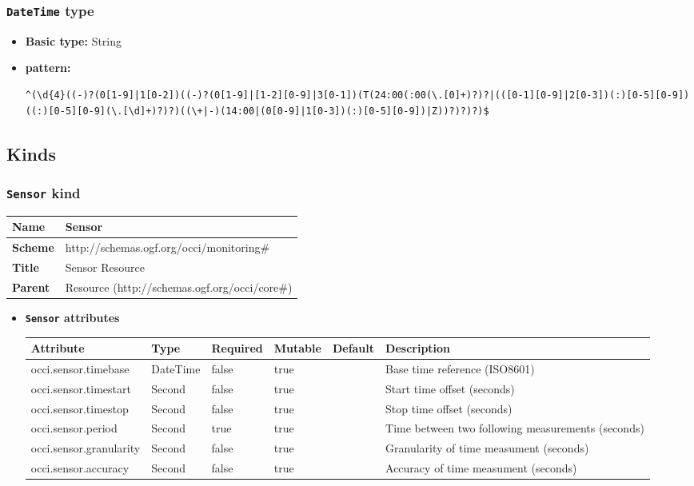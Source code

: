 \subsubsection{\texttt{DateTime} type}

\begin{itemize}
\item \textbf{Basic type:} String
	\item \textbf{pattern:} \begin{verbatim}^(\d{4}((-)?(0[1-9]|1[0-2])((-)?(0[1-9]|[1-2][0-9]|3[0-1])(T(24:00(:00(\.[0]+)?)?|(([0-1][0-9]|2[0-3])(:)[0-5][0-9])((:)[0-5][0-9](\.[\d]+)?)?)((\+|-)(14:00|(0[0-9]|1[0-3])(:)[0-5][0-9])|Z))?)?)?)$\end{verbatim}
\end{itemize}
\subsection{Kinds}
\subsubsection{\texttt{Sensor} kind}
\begin{center}
\begin{tabular}{|l|l|}
  \hline
  \textbf{Name} & Sensor \\
  \hline  
  \textbf{Scheme} & http://schemas.ogf.org/occi/monitoring\# \\
  \hline
  \textbf{Title} & Sensor Resource \\
  \hline
  \textbf{Parent} & Resource (http://schemas.ogf.org/occi/core\#) \\
  \hline
\end{tabular}
\end{center}
\begin{itemize}
\item \textbf{\texttt{Sensor} attributes}

\begin{tabularx}{\textwidth}{|l|l|p{1.4cm}|p{1.3cm}|l|X|}
  \hline
  \textbf{Attribute} & \textbf{Type} & \textbf{Required} & \textbf{Mutable} & \textbf{Default} & \textbf{Description} \\
  \hline  
  occi.sensor.timebase & DateTime & false & true &  & Base time reference (ISO8601) \\
  \hline
  occi.sensor.timestart & Second & false & true &  & Start time offset (seconds) \\
  \hline
  occi.sensor.timestop & Second & false & true &  & Stop time offset (seconds) \\
  \hline
  occi.sensor.period & Second & true & true &  & Time between two following measurements (seconds) \\
  \hline
  occi.sensor.granularity & Second & false & true &  & Granularity of time measument (seconds) \\
  \hline
  occi.sensor.accuracy & Second & false & true &  & Accuracy of time measument (seconds) \\
  \hline
\end{tabularx}
\end{itemize}




